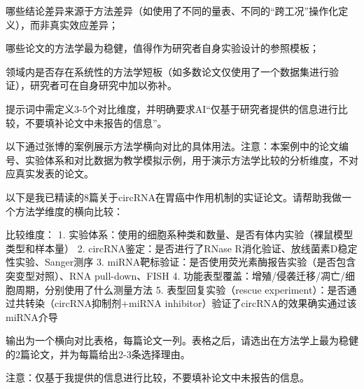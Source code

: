 哪些结论差异来源于方法差异（如使用了不同的量表、不同的``跨工况''操作化定义），而非真实效应差异；

哪些论文的方法学最为稳健，值得作为研究者自身实验设计的参照模板；

领域内是否存在系统性的方法学短板（如多数论文仅使用了一个数据集进行验证），研究者可在自身研究中加以弥补。

提示词中需定义3-5个对比维度，并明确要求AI``仅基于研究者提供的信息进行比较，不要填补论文中未报告的信息''。

以下通过张博的案例展示方法学横向对比的具体用法。注意：本案例中的论文编号、实验体系和对比数据为教学模拟示例，用于演示方法学比较的分析维度，不对应真实发表的论文。

\begin{userbox}
以下是我已精读的8篇关于circRNA在胃癌中作用机制的实证论文。请帮助我做一个方法学维度的横向比较：

比较维度：
1. 实验体系：使用的细胞系种类和数量、是否有体内实验（裸鼠模型类型和样本量）
2. circRNA鉴定：是否进行了RNase R消化验证、放线菌素D稳定性实验、Sanger测序
3. miRNA靶标验证：是否使用荧光素酶报告实验（是否包含突变型对照）、RNA pull-down、FISH
4. 功能表型覆盖：增殖/侵袭迁移/凋亡/细胞周期，分别使用了什么测量方法
5. 表型回复实验（rescue experiment）：是否通过共转染（circRNA抑制剂+miRNA inhibitor）验证了circRNA的效果确实通过该miRNA介导

输出为一个横向对比表格，每篇论文一列。表格之后，请选出在方法学上最为稳健的2篇论文，并为每篇给出2-3条选择理由。

注意：仅基于我提供的信息进行比较，不要填补论文中未报告的信息。
\end{userbox}

